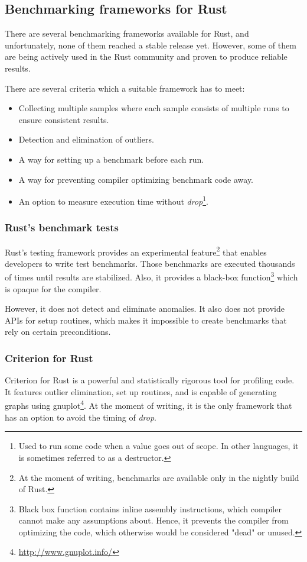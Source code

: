 \subsection{Benchmarking frameworks for Rust}
There are several benchmarking frameworks available for Rust, and unfortunately, none of them reached a stable release yet. However, some of them are being actively used in the Rust community and proven to produce reliable results.

There are several criteria which a suitable framework has to meet:
\begin{itemize}
    \item Collecting multiple samples where each sample consists of multiple runs to ensure consistent results.
    \item Detection and elimination of outliers.
    \item A way for setting up a benchmark before each run.
    \item A way for preventing compiler optimizing benchmark code away.
    \item An option to measure execution time without \emph{drop}\footnote{Used to run some code when a value goes out of scope. In other languages, it is sometimes referred to as a destructor.}.
\end{itemize}

\subsubsection*{Rust's benchmark tests}
Rust's testing framework provides an experimental feature\footnote{At the moment of writing, benchmarks are available only in the nightly build of Rust.} that enables developers to write test benchmarks. Those benchmarks are executed thousands of times until results are stabilized. Also, it provides a black-box function\footnote{Black box function contains inline assembly instructions, which compiler cannot make any assumptions about. Hence, it prevents the compiler from optimizing the code, which otherwise would be considered "dead" or unused.} which is opaque for the compiler.

However, it does not detect and eliminate anomalies. It also does not provide APIs for setup routines, which makes it impossible to create benchmarks that rely on certain preconditions.

\subsubsection*{Criterion for Rust}
Criterion for Rust is a powerful and statistically rigorous tool for profiling code. It features outlier elimination, set up routines, and is capable of generating graphs using gnuplot\footnote{\url{http://www.gnuplot.info/}}. At the moment of writing, it is the only framework that has an option to avoid the timing of \emph{drop}.

